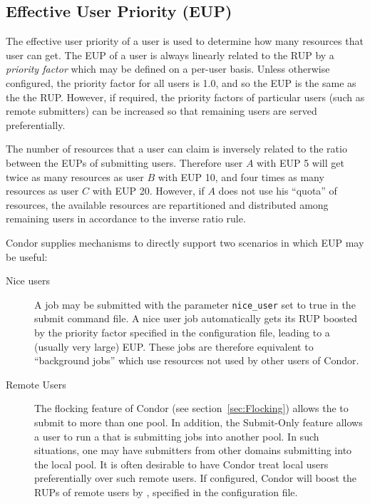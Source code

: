 \subsection{Effective User Priority (EUP)}
The effective user priority of a user is used to determine how many resources 
that user can get.  The EUP of a user is always linearly related to the RUP
by a \emph{priority factor} which may be defined on a per-user basis.  Unless 
otherwise configured, the priority factor for all users is 1.0, and so the EUP 
is the same as the the RUP.  However, if required, the priority factors of
particular users (such as remote submitters) can be increased so that 
remaining users are served preferentially.

The number of resources that a user can claim is inversely related to the ratio 
between the EUPs of submitting users.  Therefore user $A$ with EUP 5 will get 
twice as many resources as user $B$ with EUP 10, and four times as many 
resources as user $C$ with EUP 20.  However, if $A$ does not use his ``quota''
of resources, the available resources are repartitioned and distributed among
remaining users in accordance to the inverse ratio rule.

Condor supplies mechanisms to directly support two scenarios in which EUP may
be useful:
\begin{description}
	\item[Nice users]  A job may be submitted with the parameter 
	\texttt{nice\_user} set to true in the submit command file.  A nice user
	job automatically gets its RUP boosted by the 
	 priority factor specified in the 
	configuration file, leading to a (usually very large) EUP.  These jobs are 
	therefore equivalent to ``background jobs'' which use resources not used 
	by other users of Condor.

	\item[Remote Users] The flocking feature of Condor (see
	section~\ref{sec:Flocking}) allows the  to
	submit to more than one pool.
	In addition, the Submit-Only feature allows a user to run a
	 that is submitting jobs into another pool.
	In such situations, one may have submitters from other domains
	submitting into the local pool.
	It is often desirable to have Condor treat local users
	preferentially over such remote users.
	If configured, Condor will boost the RUPs of remote users by
	, specified in the configuration
	file.
\end{description}

